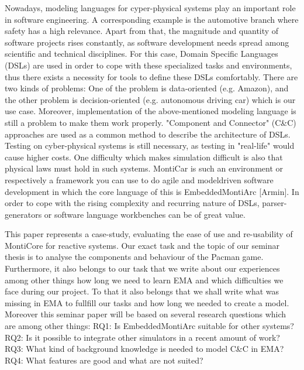 Nowadays, modeling languages for cyper-physical systems play an important role in software
engineering. A corresponding example is the automotive branch where safety has a high relevance.
Apart from that, the magnitude and quantity of software projects rises constantly, as software
development needs spread among scientific and technical disciplines. For this case, Domain Specific
Languages (DSLs) are used in order to cope with these specialized tasks and environments, thus there
exists a necessity for tools to define these DSLs comfortably. There are two kinds of problems: One of
the problem is data-oriented (e.g. Amazon), and the other problem is decision-oriented (e.g.
autonomous driving car) which is our use case. Moreover, implementation of the above-mentioned
modeling language is still a problem to make them work properly. "Component and Connector"
(C\&C) approaches are used as a common method to describe the architecture of DSLs. Testing on
cyber-physical systems is still necessary, as testing in "real-life" would cause higher costs. One
difficulty which makes simulation difficult is also that physical laws must hold in such systems.
MontiCar is such an environment or respectively a framework you can use to do agile and modeldriven software development in which the core language of this is EmbeddedMontiArc [Armin]. In
order to cope with the rising complexity and recurring nature of DSLs, parser-generators or software
language workbenches can be of great value.

This paper represents a case-study, evaluating the ease of use and re-usability of MontiCore for
reactive systems. Our exact task and the topic of our seminar thesis is to analyse the components
and behaviour of the Pacman game. Furthermore, it also belongs to our task that we write about our
experiences among other things how long we need to learn EMA and which difficulties we face
during our project. To that it also belongs that we shall write what was missing in EMA to fullfill our
tasks and how long we needed to create a model. Moreover this seminar paper will be based on
several research questions which are among other things:
RQ1: Is EmbeddedMontiArc suitable for other systems?
RQ2: Is it possible to integrate other simulators in a recent amount of work?
RQ3: What kind of background knowledge is needed to model C\&C in EMA?
RQ4: What features are good and what are not suited?